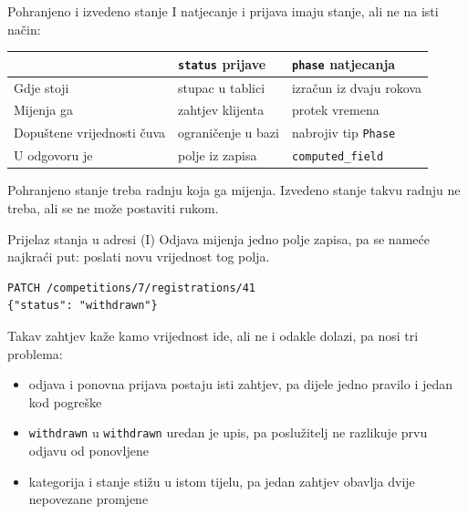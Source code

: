\begin{frame}{Pohranjeno i izvedeno stanje}
I natjecanje i prijava imaju stanje, ali ne na isti način:

\vspace{0.5em}
\begin{center}
{\small
\setlength{\tabcolsep}{0pt}
\renewcommand{\arraystretch}{1.5}
\begin{tabular}{@{}L{3.2cm}L{4.0cm}L{4.0cm}@{}}
  \toprule
  & \textbf{\texttt{status} prijave} & \textbf{\texttt{phase} natjecanja} \\
  \midrule
  Gdje stoji        & stupac u tablici & izračun iz dvaju rokova \\
  Mijenja ga        & zahtjev klijenta & protek vremena \\
  Dopuštene vrijednosti čuva & ograničenje u bazi & nabrojiv tip \texttt{Phase} \\
  U odgovoru je     & polje iz zapisa & \texttt{computed\_field} \\
  \bottomrule
\end{tabular}
}
\end{center}

\vspace{0.6em}
Pohranjeno stanje treba radnju koja ga mijenja. Izvedeno stanje takvu radnju ne treba, ali se ne može postaviti rukom.
\end{frame}

\begin{frame}[fragile]{Prijelaz stanja u adresi (I)}
Odjava mijenja jedno polje zapisa, pa se nameće najkraći put: poslati novu vrijednost tog polja.

\begin{lstlisting}
PATCH /competitions/7/registrations/41
{"status": "withdrawn"}
\end{lstlisting}

\vspace{0.4em}
Takav zahtjev kaže kamo vrijednost ide, ali ne i odakle dolazi, pa nosi tri problema:

\begin{itemize}
  \itemsep0.3em
  \item odjava i ponovna prijava postaju isti zahtjev, pa dijele jedno pravilo i jedan kod pogreške
  \item \texttt{withdrawn} u \texttt{withdrawn} uredan je upis, pa poslužitelj ne razlikuje prvu odjavu od ponovljene
  \item kategorija i stanje stižu u istom tijelu, pa jedan zahtjev obavlja dvije nepovezane promjene
\end{itemize}
\end{frame}

